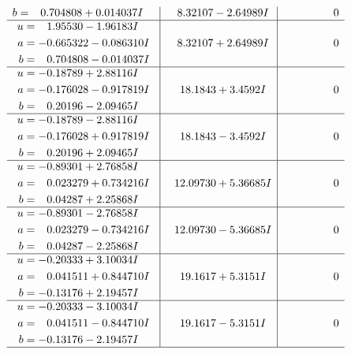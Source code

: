 \documentclass[1p]{elsarticle_modified}
\theoremstyle{definition}
\begin{document}
$$\begin{array}{c|c|c}
\begin{aligned}
b &= \phantom{-}0.704808 + 0.014037 I\end{aligned}
 & \phantom{-}8.32107 - 2.64989 I & \phantom{-0.000000 } 0 \\ \hline\begin{aligned}
u &= \phantom{-}1.95530 - 1.96183 I \\
a &= -0.665322 - 0.086310 I \\
b &= \phantom{-}0.704808 - 0.014037 I\end{aligned}
 & \phantom{-}8.32107 + 2.64989 I & \phantom{-0.000000 } 0 \\ \hline\begin{aligned}
u &= -0.18789 + 2.88116 I \\
a &= -0.176028 - 0.917819 I \\
b &= \phantom{-}0.20196 - 2.09465 I\end{aligned}
 & \phantom{-}18.1843 + 3.4592 I & \phantom{-0.000000 } 0 \\ \hline\begin{aligned}
u &= -0.18789 - 2.88116 I \\
a &= -0.176028 + 0.917819 I \\
b &= \phantom{-}0.20196 + 2.09465 I\end{aligned}
 & \phantom{-}18.1843 - 3.4592 I & \phantom{-0.000000 } 0 \\ \hline\begin{aligned}
u &= -0.89301 + 2.76858 I \\
a &= \phantom{-}0.023279 + 0.734216 I \\
b &= \phantom{-}0.04287 + 2.25868 I\end{aligned}
 & \phantom{-}12.09730 + 5.36685 I & \phantom{-0.000000 } 0 \\ \hline\begin{aligned}
u &= -0.89301 - 2.76858 I \\
a &= \phantom{-}0.023279 - 0.734216 I \\
b &= \phantom{-}0.04287 - 2.25868 I\end{aligned}
 & \phantom{-}12.09730 - 5.36685 I & \phantom{-0.000000 } 0 \\ \hline\begin{aligned}
u &= -0.20333 + 3.10034 I \\
a &= \phantom{-}0.041511 + 0.844710 I \\
b &= -0.13176 + 2.19457 I\end{aligned}
 & \phantom{-}19.1617 + 5.3151 I & \phantom{-0.000000 } 0 \\ \hline\begin{aligned}
u &= -0.20333 - 3.10034 I \\
a &= \phantom{-}0.041511 - 0.844710 I \\
b &= -0.13176 - 2.19457 I\end{aligned}
 & \phantom{-}19.1617 - 5.3151 I & \phantom{-0.000000 } 0\\
 \hline 
 \end{array}$$\newpage\newpage\renewcommand{\arraystretch}{1}
\end{document}
